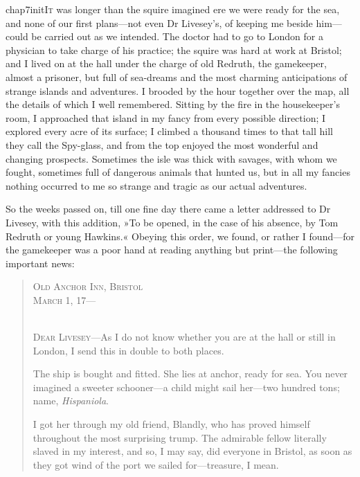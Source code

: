 
   \lettrine[lines=4,image=true]{chap7initI}{t} was longer than the squire imagined ere we were ready for the sea, and none of our first plans—not even Dr Livesey's, of keeping me beside him—could be carried out as we intended. The doctor had to go to London for a physician to take charge of his practice; the squire was hard at work at Bristol; and I lived on at the hall under the charge of old Redruth, the gamekeeper, almost a prisoner, but full of sea-dreams and the most charming anticipations of strange islands and adventures. I brooded by the hour together over the map, all the details of which I well remembered. Sitting by the fire in the housekeeper's room, I approached that island in my fancy from every possible direction; I explored every acre of its surface; I climbed a thousand times to that tall hill they call the Spy-glass, and from the top enjoyed the most wonderful and changing prospects. Sometimes the isle was thick with savages, with whom we fought, sometimes full of dangerous animals that hunted us, but in all my fancies nothing occurred to me so strange and tragic as our actual adventures.

So the weeks passed on, till one fine day there came a letter addressed to Dr Livesey, with this addition, »To be opened, in the case of his absence, by Tom Redruth or young Hawkins.« Obeying this order, we found, or rather I found—for the gamekeeper was a poor hand at reading anything but print—the following important news:

\begin{quotation}
	\begin{flushright}\scshape
Old Anchor Inn, Bristol\\March 1, 17—\\
\end{flushright}
~\\
\nopagebreak
\textsc{Dear Livesey}—As I do not know whether you are at the hall or still in London, I send this in double to both places.

The ship is bought and fitted. She lies at anchor, ready for sea. You never imagined a sweeter schooner—a child might sail her—two hundred tons; name, \textit{Hispaniola}.

I got her through my old friend, Blandly, who has proved himself throughout the most surprising trump. The admirable fellow literally slaved in my interest, and so, I may say, did everyone in Bristol, as soon as they got wind of the port we sailed for—treasure, I mean.
\end{quotation}

